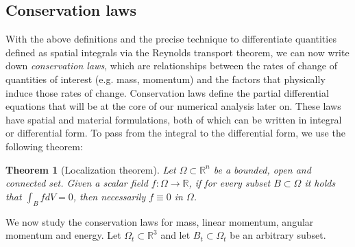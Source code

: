 \documentclass{article}
\newcommand{\R}{\mathbb{R}}
\newtheorem{theorem}{Theorem}
\begin{document}
\subsection{Conservation laws}
With the above definitions and the precise technique to differentiate quantities defined as spatial integrals via the Reynolds transport theorem, we can now write down \textit{conservation laws}, which are relationships between the rates of change of quantities of interest (e.g. mass, momentum) and the factors that physically induce those rates of change. Conservation laws define the partial differential equations that will be at the core of our numerical analysis later on. These laws have spatial and material formulations, both of which can be written in integral or differential form. To pass from the integral to the differential form, we use the following theorem: 
\begin{theorem}[Localization theorem]
    Let $\Omega\subset\R^n$ be a bounded, open and connected set. Given a scalar field $f:\Omega\to \R$, if for every subset $B\subset \Omega$ it holds that $\int_B fdV = 0$, then necessarily $f\equiv 0$ in $\Omega$. 
\end{theorem}
We now study the conservation laws for mass, linear momentum, angular momentum and energy. Let $\Omega_t\subset\R^3$ and let $B_t\subset\Omega_t$ be an arbitrary subset. 
\end{document}
